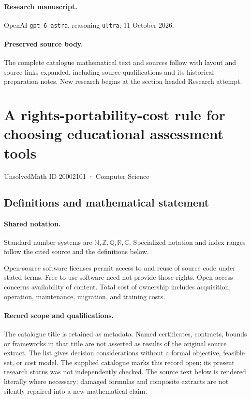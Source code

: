 \documentclass[11pt]{article}
\begin{document}
\paragraph{Research manuscript.} OpenAI \texttt{gpt-6-astra}, reasoning \texttt{ultra}; 11 October 2026.
\paragraph{Preserved source body.} The complete catalogue mathematical text and sources follow with layout and source links expanded, including source qualifications and its historical preparation notes. New research begins at the section headed Research attempt.

\section{A rights-portability-cost rule for choosing educational assessment tools}\label{20002101}
{\small UnsolvedMath ID 20002101 · Computer Science}
\subsection{Definitions and mathematical statement}

\paragraph{Shared notation.}Standard number systems are $\mathbb N,\mathbb Z,\mathbb Q,\mathbb R,\mathbb C$. Specialized notation and index ranges follow the cited source and the definitions below.


Open-source software licenses permit access to and reuse of source code under stated terms. Free-to-use software need not provide those rights. Open access concerns availability of content. Total cost of ownership includes acquisition, operation, maintenance, migration, and training costs.
\paragraph{Record scope and qualifications.}
The catalogue title is retained as metadata. Named certificates, contracts, bounds or frameworks in that title are not asserted as results of the original source extract.
The list gives decision considerations without a formal objective, feasible set, or cost model. The supplied catalogue marks this record open; its present research status was not independently checked.
The source text below is rendered literally where necessary; damaged formulas and composite extracts are not silently repaired into a new mathematical claim.
\end{document}
